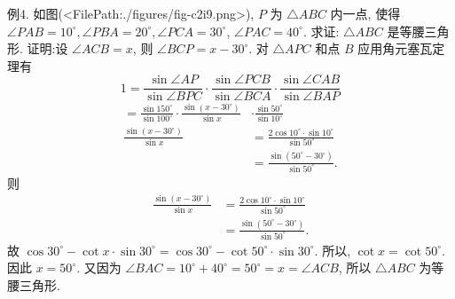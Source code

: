 例4. 如图(<FilePath:./figures/fig-c2i9.png>), $P$ 为 $\triangle A B C$ 内一点, 使得 $\angle P A B=10^{\circ}, \angle P B A=20^{\circ}, \angle P C A=30^{\circ}$, $\angle P A C=40^{\circ}$. 求证: $\triangle A B C$ 是等腰三角形.
证明:设 $\angle A C B=x$, 则 $\angle B C P=x-30^{\circ}$.
对 $\triangle A P C$ 和点 $B$ 应用角元塞瓦定理有
$$
1=\frac{\sin \angle A P}{\sin \angle B P C} \cdot \frac{\sin \angle P C B}{\sin \angle B C A} \cdot \frac{\sin \angle C A B}{\sin \angle B A P}
$$
$$
\begin{aligned}
=\frac{\sin 150^{\circ}}{\sin 100^{\circ}} \cdot \frac{\sin \left(x-30^{\circ}\right)}{\sin x} & \cdot \frac{\sin 50^{\circ}}{\sin 10^{\circ}} \\
\frac{\sin \left(x-30^{\circ}\right)}{\sin x} & =\frac{2 \cos 10^{\circ} \cdot \sin 10^{\circ}}{\sin 50^{\circ}} \\
& =\frac{\sin \left(50^{\circ}-30^{\circ}\right)}{\sin 50^{\circ}} .
\end{aligned}
$$
则
$$
\begin{aligned}
\frac{\sin \left(x-30^{\circ}\right)}{\sin x} & =\frac{2 \cos 10^{\circ} \cdot \sin 10^{\circ}}{\sin 50^{\circ}} \\
& =\frac{\sin \left(50^{\circ}-30^{\circ}\right)}{\sin 50^{\circ}} .
\end{aligned}
$$
故 $\cos 30^{\circ}-\cot x \cdot \sin 30^{\circ}=\cos 30^{\circ}-\cot 50^{\circ} \cdot \sin 30^{\circ}$.
所以, $\cot x=\cot 50^{\circ}$.
因此 $x=50^{\circ}$. 又因为 $\angle B A C=10^{\circ}+40^{\circ}=50^{\circ}=x=\angle A C B$, 所以 $\triangle A B C$ 为等腰三角形.



